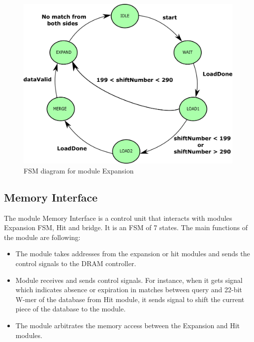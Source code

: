 \begin{figure}[t!]
\centering
\includegraphics[width=\columnwidth]{Figures/expandFSM.pdf}
\caption{FSM diagram for module Expansion} \label{fig:expandFSM}
\end{figure}
       
       
\subsection{Memory Interface}
The module Memory Interface is a control unit that interacts with modules Expansion FSM, Hit and bridge. 
It is an FSM of 7 states. The main functions of the module are following:
\begin{itemize}
\item The module takes addresses from the expansion or hit modules and sends the control signals to the DRAM controller.
\item Module receives and sends control signals. For instance, when it gets signal which indicates absence or expiration in matches between query and 22-bit W-mer of the database from Hit module, it sends signal to shift the current piece of the database to the module.
\item The module arbitrates the memory access between the Expansion and Hit modules. 
\end{itemize}

